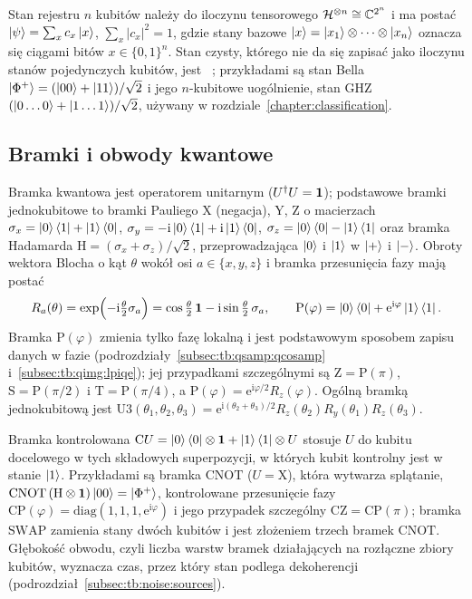 Stan rejestru $n$ kubitów należy do iloczynu tensorowego $\mathcal{H}^{\otimes n}\cong\mathbb{C}^{2^n}$ i ma postać $\ket{\psi}=\sum_{x}c_x\ket{x}$, $\sum_{x}|c_x|^2=1$, gdzie stany bazowe $\ket{x}=\ket{x_1}\otimes\dots\otimes\ket{x_n}$ oznacza się ciągami bitów $x\in\{0,1\}^n$.
Stan czysty, którego nie da się zapisać jako iloczynu stanów pojedynczych kubitów, jest ~\cite{bib:schrodinger-relations}; przykładami są stan Bella $\ket{\Phi^+}=(\ket{00}+\ket{11})/\sqrt{2}$ i jego $n$-kubitowe uogólnienie, stan GHZ $(\ket{0\dots0}+\ket{1\dots1})/\sqrt{2}$, używany w rozdziale~\ref{chapter:classification}.

\subsection{Bramki i obwody kwantowe}\label{subsec:tb:gates}

Bramka kwantowa jest operatorem unitarnym ($U^\dagger U=\mathbf{1}$); podstawowe bramki jednokubitowe to bramki Pauliego $\mathrm{X}$ (negacja), $\mathrm{Y}$, $\mathrm{Z}$ o macierzach $\sigma_x=\ket{0}\bra{1}+\ket{1}\bra{0}$, $\sigma_y=-\mathrm{i}\ket{0}\bra{1}+\mathrm{i}\ket{1}\bra{0}$, $\sigma_z=\ket{0}\bra{0}-\ket{1}\bra{1}$ oraz bramka Hadamarda $\mathrm{H}=(\sigma_x+\sigma_z)/\sqrt{2}$, przeprowadzająca $\ket{0}$ i $\ket{1}$ w $\ket{+}$ i $\ket{-}$.
Obroty wektora Blocha o kąt $\theta$ wokół osi $a\in\{x,y,z\}$ i bramka przesunięcia fazy mają postać
\begin{equation}\label{eq:tb01:rotation}
  R_a(\theta)=\exp\Bigl(-\mathrm{i}\tfrac{\theta}{2}\sigma_a\Bigr)=\cos\tfrac{\theta}{2}\,\mathbf{1}-\mathrm{i}\sin\tfrac{\theta}{2}\,\sigma_a,
  \qquad
  \mathrm{P}(\varphi)=\ket{0}\bra{0}+\mathrm{e}^{\mathrm{i}\varphi}\ket{1}\bra{1}.
\end{equation}
Bramka $\mathrm{P}(\varphi)$ zmienia tylko fazę lokalną i jest podstawowym sposobem zapisu danych w fazie (podrozdziały~\ref{subsec:tb:qsamp:qcosamp} i~\ref{subsec:tb:qimg:lpiqe}); jej przypadkami szczególnymi są $\mathrm{Z}=\mathrm{P}(\pi)$, $\mathrm{S}=\mathrm{P}(\pi/2)$ i $\mathrm{T}=\mathrm{P}(\pi/4)$, a $\mathrm{P}(\varphi)=\mathrm{e}^{\mathrm{i}\varphi/2}R_z(\varphi)$.
Ogólną bramką jednokubitową jest $\mathrm{U3}(\theta_1,\theta_2,\theta_3)=\mathrm{e}^{\mathrm{i}(\theta_2+\theta_3)/2}R_z(\theta_2)R_y(\theta_1)R_z(\theta_3)$.

Bramka kontrolowana $\mathrm{C}U=\ket{0}\bra{0}\otimes\mathbf{1}+\ket{1}\bra{1}\otimes U$ stosuje $U$ do kubitu docelowego w tych składowych superpozycji, w których kubit kontrolny jest w stanie $\ket{1}$.
Przykładami są bramka $\mathrm{CNOT}$ ($U=\mathrm{X}$), która wytwarza splątanie, $\mathrm{CNOT}\,(\mathrm{H}\otimes\mathbf{1})\ket{00}=\ket{\Phi^+}$, kontrolowane przesunięcie fazy $\mathrm{CP}(\varphi)=\mathrm{diag}(1,1,1,\mathrm{e}^{\mathrm{i}\varphi})$ i jego przypadek szczególny $\mathrm{CZ}=\mathrm{CP}(\pi)$; bramka $\mathrm{SWAP}$ zamienia stany dwóch kubitów i jest złożeniem trzech bramek $\mathrm{CNOT}$.
Głębokość obwodu, czyli liczba warstw bramek działających na rozłączne zbiory kubitów, wyznacza czas, przez który stan podlega dekoherencji (podrozdział~\ref{subsec:tb:noise:sources}).

